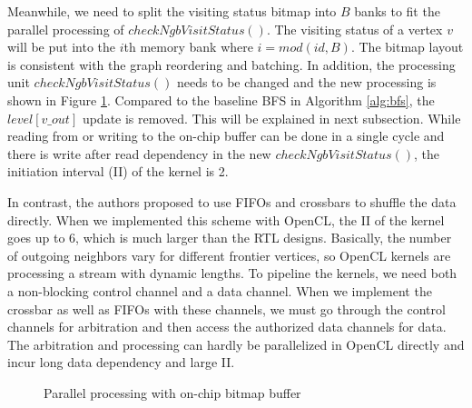 Meanwhile, we need to split the visiting status bitmap into $B$ banks
to fit the parallel processing of $checkNgbVisitStatus()$.
The visiting status of a vertex $v$ will be put into the $i$th memory
bank where $i = mod(id, B)$. The bitmap layout is consistent with the
graph reordering and batching. In addition, the processing unit
$checkNgbVisitStatus()$ needs to be changed and the new processing
is shown in Figure \ref{fig:bitmap}. Compared to the baseline BFS in
Algorithm \ref{alg:bfs}, the $level[v\_out]$ update is removed.
This will be explained in next subsection. While reading from or writing to the
on-chip buffer can be done in a single cycle and there is
write after read dependency in the new $checkNgbVisitStatus()$, the
initiation interval (II) of the kernel is 2.

In contrast, the authors \cite{ham2016graphicionado} proposed to use FIFOs
and crossbars to shuffle the data directly. When we implemented this scheme
with OpenCL, the II of the kernel goes up to 6, which is much larger than
the RTL designs. Basically, the number of outgoing neighbors vary for 
different frontier vertices, so OpenCL kernels are processing a stream 
with dynamic lengths. To pipeline the kernels, we need both a non-blocking control channel
and a data channel. When we implement the crossbar as well as FIFOs
with these channels, we must go through the control channels
for arbitration and then access the authorized data channels for data.
The arbitration and processing can hardly be parallelized in OpenCL directly
and incur long data dependency and large II.

\begin{figure}
    \caption{Parallel processing with on-chip bitmap buffer}
\label{fig:bitmap}
\vspace{-1.2em}
\end{figure}

